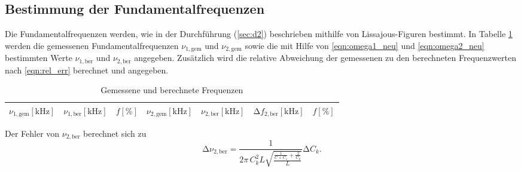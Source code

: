\subsection{Bestimmung der Fundamentalfrequenzen}

Die Fundamentalfrequenzen werden, wie in der Durchführung (\ref{sec:d2}) beschrieben mithilfe von Lissajous-Figuren bestimmt.
In Tabelle \ref{tab:3} werden die gemessenen Fundamentalfrequenzen $\nu_{1,\text{gem}}$ und $\nu_{2,\text{gem}}$ sowie die mit Hilfe von \eqref{eqn:omega1_neu} und \eqref{eqn:omega2_neu} bestimmten Werte $\nu_{1,\text{ber}}$ und $\nu_{2,\text{ber}}$ angegeben.
Zusätzlich wird die relative Abweichung der gemessenen zu den berechneten Frequenzwerten nach \eqref{eqn:rel_err} berechnet und angegeben.
\begin{table}[H]
  \centering
  \caption{Gemessene und berechnete Frequenzen}
  \label{tab:3}
  \begin{tabular}{c c c c c c c}
    \toprule
    {$\nu_{1,\text{gem}} [\si{\kilo\hertz}]$} & {$\nu_{1,\text{ber}} [\si{\kilo\hertz}]$} & {$f [\%]$} & {$\nu_{2,\text{gem}} [\si{\kilo\hertz}]$} & {$\nu_{2,\text{ber}} [\si{\kilo\hertz}]$} & {$\increment f_{2,\text{ber}} [\si{\kilo\hertz}]$} & {$f [\%]$} \\
    \midrule
    
    \bottomrule
  \end{tabular}
\end{table}
Der Fehler von $\nu_{2,\text{ber}}$ berechnet sich zu
\begin{equation}
\increment{\nu_{2,\text{ber}}} = \frac{1}{2 \pi\, C_k^2 L \sqrt{ \frac{\frac{1}{C+C_s} + \frac{2}{C_k}}{L} } } \increment{C_k}.
\end{equation}

